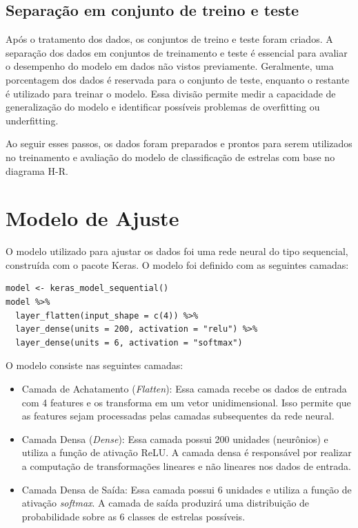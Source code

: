 \documentclass[11pt]{article}
\theoremstyle{definition}
\begin{document}
\subsection{Separação em conjunto de treino e teste}
Após o tratamento dos dados, os conjuntos de treino e teste foram criados. A separação dos dados em conjuntos de treinamento e teste é essencial para avaliar o desempenho do modelo em dados não vistos previamente. Geralmente, uma porcentagem dos dados é reservada para o conjunto de teste, enquanto o restante é utilizado para treinar o modelo. Essa divisão permite medir a capacidade de generalização do modelo e identificar possíveis problemas de overfitting ou underfitting.

Ao seguir esses passos, os dados foram preparados e prontos para serem utilizados no treinamento e avaliação do modelo de classificação de estrelas com base no diagrama H-R.

\section{Modelo de Ajuste}

O modelo utilizado para ajustar os dados foi uma rede neural do tipo sequencial, construída com o pacote Keras. O modelo foi definido com as seguintes camadas:

\begin{verbatim}
model <- keras_model_sequential()
model %>%
  layer_flatten(input_shape = c(4)) %>%
  layer_dense(units = 200, activation = "relu") %>%
  layer_dense(units = 6, activation = "softmax")
\end{verbatim}

O modelo consiste nas seguintes camadas:

\begin{itemize}
  \item Camada de Achatamento (\textit{Flatten}): Essa camada recebe os dados de entrada com 4 features e os transforma em um vetor unidimensional. Isso permite que as features sejam processadas pelas camadas subsequentes da rede neural.
  \item Camada Densa (\textit{Dense}): Essa camada possui 200 unidades (neurônios) e utiliza a função de ativação ReLU. A camada densa é responsável por realizar a computação de transformações lineares e não lineares nos dados de entrada.
  \item Camada Densa de Saída: Essa camada possui 6 unidades e utiliza a função de ativação \textit{softmax}. A camada de saída produzirá uma distribuição de probabilidade sobre as 6 classes de estrelas possíveis.
\end{itemize}
\end{document}
